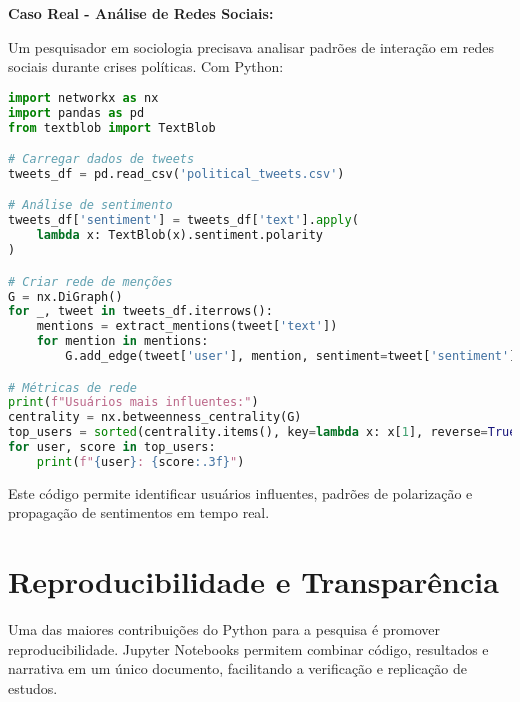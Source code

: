 \begin{researchbox}
\textbf{Caso Real - Análise de Redes Sociais:}

Um pesquisador em sociologia precisava analisar padrões de interação em redes sociais durante crises políticas. Com Python:

\begin{lstlisting}[language=Python]
import networkx as nx
import pandas as pd
from textblob import TextBlob

# Carregar dados de tweets
tweets_df = pd.read_csv('political_tweets.csv')

# Análise de sentimento
tweets_df['sentiment'] = tweets_df['text'].apply(
    lambda x: TextBlob(x).sentiment.polarity
)

# Criar rede de menções
G = nx.DiGraph()
for _, tweet in tweets_df.iterrows():
    mentions = extract_mentions(tweet['text'])
    for mention in mentions:
        G.add_edge(tweet['user'], mention, sentiment=tweet['sentiment'])

# Métricas de rede
print(f"Usuários mais influentes:")
centrality = nx.betweenness_centrality(G)
top_users = sorted(centrality.items(), key=lambda x: x[1], reverse=True)[:10]
for user, score in top_users:
    print(f"{user}: {score:.3f}")
\end{lstlisting}

Este código permite identificar usuários influentes, padrões de polarização e propagação de sentimentos em tempo real.
\end{researchbox}

\section{Reproducibilidade e Transparência}

Uma das maiores contribuições do Python para a pesquisa é promover reproducibilidade. Jupyter Notebooks permitem combinar código, resultados e narrativa em um único documento, facilitando a verificação e replicação de estudos.

